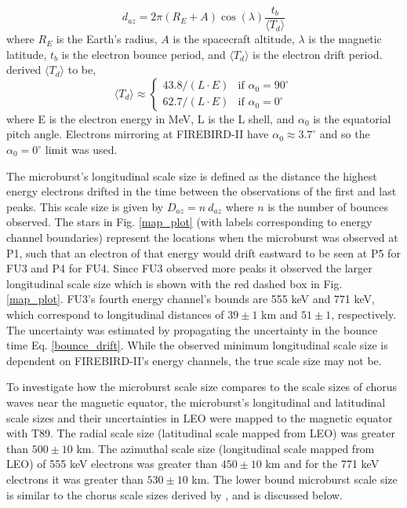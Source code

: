 \begin{equation}
d_{az} = 2 \pi (R_E + A) \cos(\lambda) \frac{t_b}{\langle T_{d} \rangle}
\label{bounce_drift}
\end{equation} where $R_E$ is the Earth's radius, $A$ is the spacecraft altitude, $\lambda$ is the magnetic latitude, $t_b$ is the electron bounce period, and $\langle T_{d} \rangle$ is the electron drift period. \citet{Parks2003} derived $\langle T_{d} \rangle$ to be,
\begin{equation}
\langle T_{d} \rangle \approx
\begin{cases}
43.8 /(L \cdot E) & \text{if } \alpha_0 = 90^{\circ} \\    62.7/(L \cdot E) & \text{if } \alpha_0 = 0^{\circ}
\end{cases}
\label{drift}
\end{equation} where E is the electron energy in MeV, L is the L shell, and $\alpha_0$ is the equatorial pitch angle. Electrons mirroring at FIREBIRD-II have $\alpha_0 {\approx} 3.7^{\circ}$ and so the $\alpha_0 = 0^{\circ}$ limit was used.


The microburst's longitudinal scale size is defined as the distance the highest energy electrons drifted in the time between the observations of the first and last peaks. This scale size is given by $D_{az} = n \ d_{az}$ where $n$ is the number of bounces observed. The stars in Fig. \ref{map_plot} (with labels corresponding to energy channel boundaries) represent the locations when the microburst was observed at P1, such that an electron of that energy would drift eastward to be seen at P5 for FU3 and P4 for FU4. Since FU3 observed more peaks it observed the larger longitudinal scale size which is shown with the red dashed box in Fig. \ref{map_plot}. FU3's fourth energy channel's bounds are 555 keV and 771 keV, which correspond to longitudinal distances of $ 39 \pm 1$ km and $ 51 \pm 1$, respectively. The uncertainty was estimated by propagating the uncertainty in the bounce time Eq. \ref{bounce_drift}. While the observed minimum longitudinal scale size is dependent on FIREBIRD-II's energy channels, the true scale size may not be.

To investigate how the microburst scale size compares to the scale sizes of chorus waves near the magnetic equator, the microburst's longitudinal and latitudinal scale sizes and their uncertainties in LEO were mapped to the magnetic equator with T89. The radial scale size (latitudinal scale mapped from LEO) was greater than $500 \pm​ 10$ km. The azimuthal scale size (longitudinal scale mapped from LEO) of 555 keV electrons was greater than $450 \pm 10$ km and for the 771 keV electrons it was greater than $530 \pm 10$ km. The lower bound microburst scale size is similar to the chorus scale sizes derived by \citet{Agapitov2011b, Agapitov2017a}, and is discussed below.

